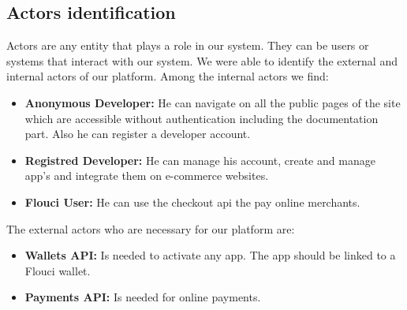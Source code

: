 \begin{spacing}{1.2}
\subsection{Actors identification}
Actors are any entity that plays a role in our system. They can be users or systems that interact with our system. We were able to identify the external and internal actors of our platform. 
\newline
Among the internal actors we find:
\begin{itemize}
  \item \textbf{Anonymous Developer:} He can navigate on all the public pages of the site which are
accessible without authentication including the documentation part. Also he can register a developer account.
  \item \textbf{Registred Developer:} He can manage his account, create and manage app's and integrate them on e-commerce websites.
  \item \textbf{Flouci User:} He can use the checkout api the pay online merchants.
\end{itemize}
The external actors who are necessary for our platform are:
\begin{itemize}
  \item \textbf{Wallets API:} Is needed to activate any app. The app should be linked to a Flouci wallet.
  \item \textbf{Payments API:} Is needed for online payments.
\end{itemize}

\end{spacing}
